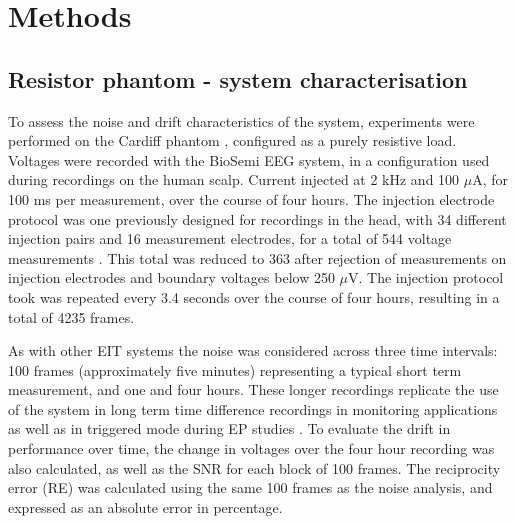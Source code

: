 \section{Methods}
\subsection{Resistor phantom - system characterisation}

To assess the noise and drift characteristics of the system, experiments were performed on the Cardiff phantom \cite{griffiths1995cole}, configured as a purely resistive load. Voltages were recorded with the BioSemi EEG system, in a configuration used during recordings on the human scalp. Current injected at 2 kHz and 100 $\mu$A, for 100 ms per measurement, over the course of four hours. The injection electrode protocol was one previously designed for recordings in the head, with 34 different injection pairs and 16 measurement electrodes, for a total of 544 voltage measurements \cite{Fabrizi2009}. This total was reduced to 363 after rejection of measurements on injection electrodes and boundary voltages below 250 $\mu$V. The injection protocol took was repeated every 3.4 seconds over the course of four hours, resulting in a total of 4235 frames. 

As with other EIT systems \cite{oh2007multi} the noise was considered across three time intervals: 100 frames (approximately five minutes) representing a typical short term measurement, and one and four hours. These longer recordings replicate the use of the system in long term time difference recordings in monitoring applications \cite{fu2014use} \cite{adler2012whither} as well as in triggered mode during EP studies \cite{Aristovich_2016}. To evaluate the drift in performance over time, the change in voltages over the four hour recording was also calculated, as well as the SNR for each block of 100 frames. The reciprocity error (RE) was calculated using the same 100 frames as the noise analysis, and expressed as an absolute error in percentage.


